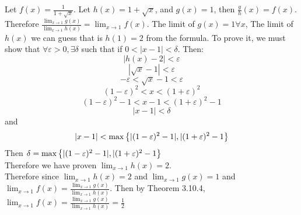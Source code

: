 \documentclass{article}
\begin{document}
\begin{homeworkProblem}
    \solution
    Let $f(x) = \frac{1}{1 + \sqrt{x}}$. Let $h(x) = 1 + \sqrt{x}$, and $g(x) = 1$, then $\frac{g}{h}(x) = f(x)$. Therefore $\frac{\lim_{x \to 1}{g(x)}}{\lim_{x \to 1}{h(x)}} = \lim_{x \to 1}{f(x)}$. The limit of $g(x) = 1 \forall x$, The limit of $h(x)$ we can guess that is $h(1) = 2$ from the formula. To prove it, we must show that $\forall \varepsilon > 0, \exists \delta$ such that if $0 < |x - 1| < \delta$. Then: $$|h(x) - 2| < \varepsilon$$ $$|\sqrt{x} - 1| < \varepsilon$$ $$-\varepsilon < \sqrt{x} - 1 < \varepsilon$$ $$(1-\varepsilon)^2 < x <(1+\varepsilon)^2$$ $$(1-\varepsilon)^2 -1 < x - 1 <(1+\varepsilon)^2 -1$$ $$|x - 1| < \delta$$ and $$|x  - 1| < \max \left\{|(1-\varepsilon)^2 -1|, |(1+\varepsilon)^2 - 1\right\}$$ Then $\delta = \max \left\{|(1-\varepsilon)^2 -1|, |(1+\varepsilon)^2 - 1\right\}$\\ Therefore we have proven $\lim_{x \to 1}{h(x) = 2}$.\\ Therefore since $\lim_{x \to 1}{h(x) = 2}$ and $\lim_{x \to 1}{g(x) = 1}$  and $\lim_{x \to 1}{f(x)} = \frac{\lim_{x \to 1}{g(x)}}{\lim_{x \to 1}{h(x)}}$. Then by Theorem 3.10.4, $\lim_{x \to 1}{f(x)} = \frac{\lim_{x \to 1}{g(x)}}{\lim_{x \to 1}{h(x)}} = \frac{1}{2}$
\end{homeworkProblem}
\end{document}
